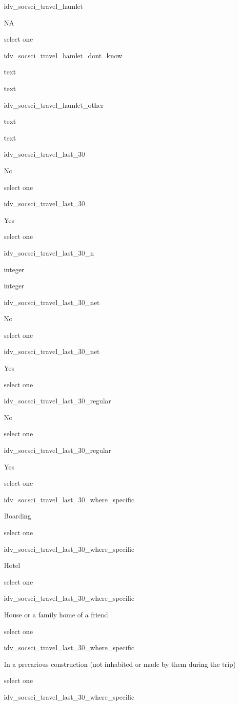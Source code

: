 \documentclass[]{article}
\begin{document}
idv\_socsci\_travel\_hamlet

NA

select one

idv\_socsci\_travel\_hamlet\_dont\_know

text

text

idv\_socsci\_travel\_hamlet\_other

text

text

idv\_socsci\_travel\_last\_30

No

select one

idv\_socsci\_travel\_last\_30

Yes

select one

idv\_socsci\_travel\_last\_30\_n

integer

integer

idv\_socsci\_travel\_last\_30\_net

No

select one

idv\_socsci\_travel\_last\_30\_net

Yes

select one

idv\_socsci\_travel\_last\_30\_regular

No

select one

idv\_socsci\_travel\_last\_30\_regular

Yes

select one

idv\_socsci\_travel\_last\_30\_where\_specific

Boarding

select one

idv\_socsci\_travel\_last\_30\_where\_specific

Hotel

select one

idv\_socsci\_travel\_last\_30\_where\_specific

House or a family home of a friend

select one

idv\_socsci\_travel\_last\_30\_where\_specific

In a precarious construction (not inhabited or made by them during the
trip)

select one

idv\_socsci\_travel\_last\_30\_where\_specific
\end{document}
